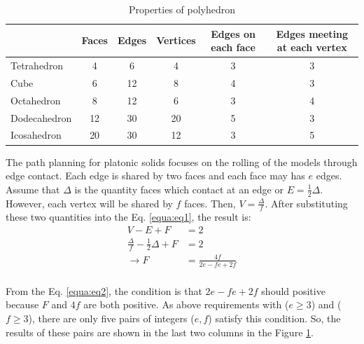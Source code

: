 %
\begin{table}[H]
\centering
\caption{Properties of polyhedron}
\label{tab:tb1}
\begin{tabular}{|l|c|c|c|c|c|}
\hline
             & Faces & Edges & Vertices & Edges on each face & Edges meeting at each vertex \\ \hline
Tetrahedron  & 4     & 6     & 4        & 3                  & 3                            \\ \hline
Cube         & 6     & 12    & 8        & 4                  & 3                            \\ \hline
Octahedron   & 8     & 12    & 6        & 3                  & 4                            \\ \hline
Dodecahedron & 12    & 30    & 20       & 5                  & 3                            \\ \hline
Icosahedron  & 20    & 30    & 12       & 3                  & 5                            \\ \hline
\end{tabular}
\end{table}
%

\noindent The path planning for platonic solids focuses on the rolling of the models through edge contact. Each edge is shared by two faces and each face may has $e$ edges. Assume that $\Delta $ is the quantity faces which contact at an edge or $E=\frac{1}{2}\Delta $. However, each vertex will be shared by $f$ faces. Then, $V=\frac{\Delta}{f}$. After substituting these two quantities into the Eq. \ref{equa:eq1}, the result is:
%
%
\begin{equation} 
\label{equa:eq2}
\begin{split}
V-E+F &= 2\\
\frac{\Delta}{f} - \frac{1}{2}\Delta + F &= 2\\
\rightarrow F &= \frac{4f}{2e-fe+2f}\\
\end{split}
\end{equation}
%

\noindent From the Eq. \ref{equa:eq2}, the condition is that $2e-fe+2f$ should positive because $F$ and $4f$ are both positive. 
As above requirements with ($e\geq3$) and ($f\geq3$), there are only five pairs of integers ($e,f$) satisfy this condition. 
So, the results of these pairs are shown in the last two columns in the Figure \ref{tab:tb1}.\\

